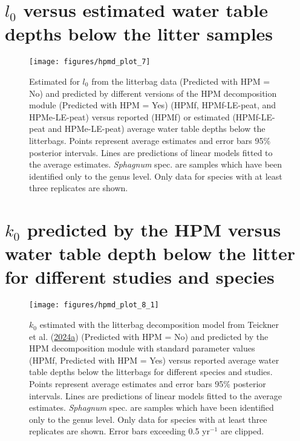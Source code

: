 \documentclass[
  12pt,
]{article}
\begin{document}
\hypertarget{sup-6}{%
\section{\texorpdfstring{\(l_0\) versus estimated water table depths below the litter samples}{l\_0 versus estimated water table depths below the litter samples}}\label{sup-6}}



\begin{figure}[H]

{\centering \texttt{[image: figures/hpmd\_plot\_7]} 

}

\caption{Estimated for \(l_0\) from the litterbag data (Predicted with HPM = No) and predicted by different versions of the HPM decomposition module (Predicted with HPM = Yes) (HPMf, HPMf-LE-peat, and HPMe-LE-peat) versus reported (HPMf) or estimated (HPMf-LE-peat and HPMe-LE-peat) average water table depths below the litterbags. Points represent average estimates and error bars 95\% posterior intervals. Lines are predictions of linear models fitted to the average estimates. \emph{Sphagnum} spec. are samples which have been identified only to the genus level. Only data for species with at least three replicates are shown.}\label{fig:sup-hpmd-plot-7}
\end{figure}

\hypertarget{sup-8}{%
\section{\texorpdfstring{\(k_0\) predicted by the HPM versus water table depth below the litter for different studies and species}{k\_0 predicted by the HPM versus water table depth below the litter for different studies and species}}\label{sup-8}}



\begin{figure}[H]

{\centering \texttt{[image: figures/hpmd\_plot\_8\_1]} 

}

\caption{\(k_0\) estimated with the litterbag decomposition model from Teickner et al. (\protect\hyperlink{ref-Teickner.2024}{2024a}) (Predicted with HPM = No) and predicted by the HPM decomposition module with standard parameter values (HPMf, Predicted with HPM = Yes) versus reported average water table depths below the litterbags for different species and studies. Points represent average estimates and error bars 95\% posterior intervals. Lines are predictions of linear models fitted to the average estimates. \emph{Sphagnum} spec. are samples which have been identified only to the genus level. Only data for species with at least three replicates are shown. Error bars exceeding 0.5 yr\(^{-1}\) are clipped.}\label{fig:sup-hpmd-plot-8-1}
\end{figure}
\end{document}
